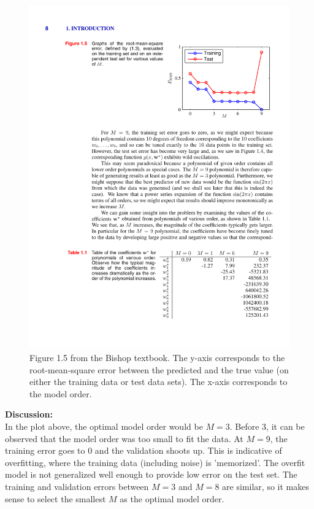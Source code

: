 \documentclass[11pt]{article}
\begin{document}
\begin{figure}[h!]
\centering
\includegraphics{problem1.pdf}
\caption{Figure 1.5 from the Bishop textbook.  The y-axis corresponds to the root-mean-square error between the predicted and the true value (on either the training data or test data sets).  The x-axis corresponds to the model order. }
\end{figure}

\noindent
\textbf{Discussion:}\\
\noindent
In the plot above, the optimal model order would be $M=3$.  Before 3, it can be observed that the model order was too small to fit the data.  At $M=9$, the training error goes to 0 and the validation shoots up. This is indicative of overfitting, where the training data (including noise) is 'memorized'.  The overfit model is not generalized well enough to provide low error on the test set. The training and validation errors between $M=3$ and $M=8$ are similar, so it makes sense to select the smallest $M$ as the optimal model order. \\
\end{document}
